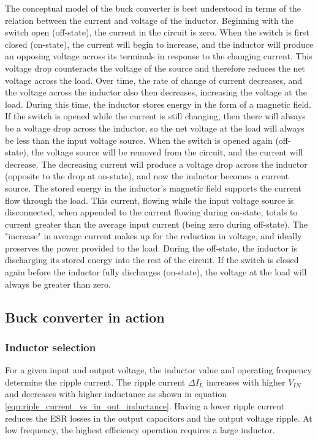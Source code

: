 \documentclass[\main/main.tex]{subfiles}
\begin{document}
The conceptual model of the buck converter is best understood in terms of the relation between the current and voltage of the inductor. Beginning with the switch open (off-state), the current in the circuit is zero. When the switch is first closed (on-state), the current will begin to increase, and the inductor will produce an opposing voltage across its terminals in response to the changing current. This voltage drop counteracts the voltage of the source and therefore reduces the net voltage across the load. Over time, the rate of change of current decreases, and the voltage across the inductor also then decreases, increasing the voltage at the load. During this time, the inductor stores energy in the form of a magnetic field. If the switch is opened while the current is still changing, then there will always be a voltage drop across the inductor, so the net voltage at the load will always be less than the input voltage source. When the switch is opened again (off-state), the voltage source will be removed from the circuit, and the current will decrease. The decreasing current will produce a voltage drop across the inductor (opposite to the drop at on-state), and now the inductor becomes a current source. The stored energy in the inductor's magnetic field supports the current flow through the load. This current, flowing while the input voltage source is disconnected, when appended to the current flowing during on-state, totals to current greater than the average input current (being zero during off-state). The "increase" in average current makes up for the reduction in voltage, and ideally preserves the power provided to the load. During the off-state, the inductor is discharging its stored energy into the rest of the circuit. If the switch is closed again before the inductor fully discharges (on-state), the voltage at the load will always be greater than zero.

\subsection{Buck converter in action}

\subsubsection{Inductor selection}
For a given input and output voltage, the inductor value
and operating frequency determine the ripple current. The
ripple current $\Delta I_{L}$ increases with higher $V_{IN}$ and decreases with higher inductance as shown in equation \ref{eqn:riple_current_vs_in_out_inductance}.
Having a lower ripple current reduces the ESR losses in
the output capacitors and the output voltage ripple. At low frequency, the highest efficiency operation requires a large inductor.
\end{document}
